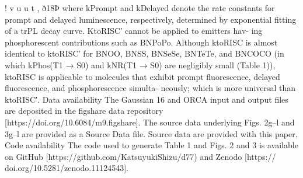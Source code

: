 !
v
u
u
t
,
ð18Þ
where kPrompt and kDelayed denote the rate constants for prompt and
delayed luminescence, respectively, determined by exponential ﬁtting
of a trPL decay curve. KtoRISC′ cannot be applied to emitters hav-
ing phosphorescent contributions such as BNPoPo. Although ktoRISC is
almost identical to ktoRISC′ for BNOO, BNSS, BNSeSe, BNTeTe, and
BNCOCO (in which kPhos(T1 → S0) and kNR(T1 → S0) are negligibly small
(Table 1)), ktoRISC is applicable to molecules that exhibit prompt
ﬂuorescence, delayed ﬂuorescence, and phosphorescence simulta-
neously; which is more universal than ktoRISC′.
Data availability
The Gaussian 16 and ORCA input and output ﬁles are deposited in the
ﬁgshare data repository [https://doi.org/10.6084/m9.ﬁgshare]. The
source data underlying Figs. 2g–l and 3g–l are provided as a Source
Data ﬁle. Source data are provided with this paper.
Code availability
The code used to generate Table 1 and Figs. 2 and 3 is available on
GitHub [https://github.com/KatsuyukiShizu/d77) and Zenodo [https://
doi.org/10.5281/zenodo.11124543].



